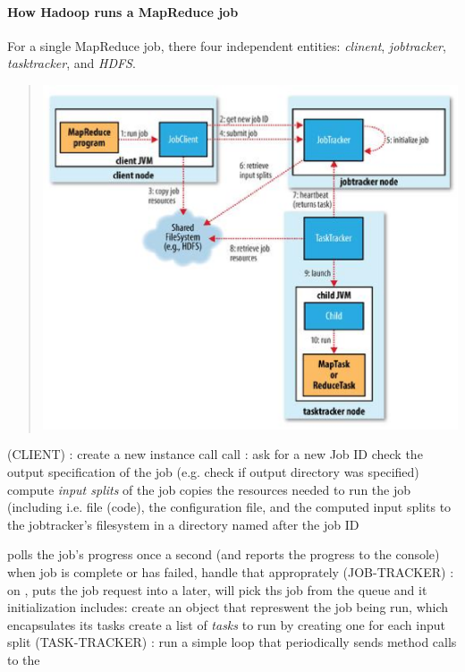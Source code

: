 \documentclass{memo}
\begin{document}
\paragraph{How Hadoop runs a MapReduce job}
For a single MapReduce job, there four independent entities: {\em clinent\/},
{\em jobtracker\/}, {\em tasktracker\/}, and {\em HDFS\/}. 

\begin{quote}
\centerline{\includegraphics[scale=0.5]{mapred.ps}}
\end{quote}
\ben
\w (CLIENT) :
  \ben
  \w create a new  instance
  \w call 
    \bit
    \w call : ask  for a new Job
    ID
    \w check the output specification of the job (e.g. check if output
    directory was specified)
    \w compute {\em input splits\/} of the job 
    \w copies the resources needed to run the job (including i.e. 
      file (code), the configuration file, and the computed input splits to
        the jobtracker's filesystem in a directory named after the job ID
        
    \eit
  \w polls the job's progress once a second (and reports the progress to the
  console) 
  \w when job is complete or has failed, handle that approprately
  \een
\w (JOB-TRACKER) : 
  \ben
  \w on , puts the job request into a 
  \w later,  will pick ths job from the queue and
   it
  \w initialization includes:
     \bit
     \w create an object that represwent the job being run, which encapsulates
     its tasks 
     \w create a list of {\em tasks\/} to run by creating one  for
     each input split
     \eit
  \een
\w (TASK-TRACKER) :
  \ben
  \w run a simple loop that periodically sends  method calls to
  the  
  \w 
  \een
\een
\end{document}
